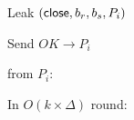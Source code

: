 \begin{bbox}[title={$\F_{\msf{pay}} (P_s, P_r, \msf{balances}, \Delta)$}]
\begin{renumerate}

		
		\item Leak $({\mathsf {close}}, b_r, b_s, P_i)$

		\item Send $OK \rightarrow P_i$
		
	\end{renumerate}

\OnInput {} from $P_i$:

	\begin{renumerate}
		\item In $O(k \times \Delta)$ round:
			


	\end{renumerate}	

\end{bbox}
